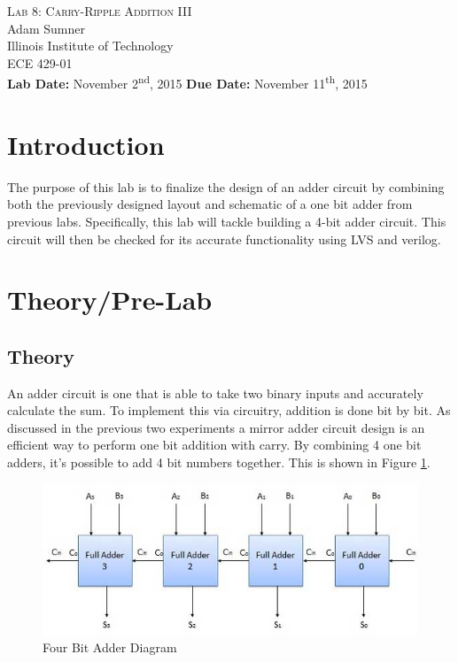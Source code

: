 \documentclass[12pt]{article}
\begin{document}
\begin{titlepage}
	\begin{center}
		
		
		\vfill
		
		\textsc{\LARGE Lab 8: Carry-Ripple Addition III}\\[1.5cm]
		
		\Large Adam Sumner\\[0.5cm]
		
		\Large Illinois Institute of Technology\\[0.5cm]
		
		\Large ECE 429-01\\[0.5cm]	
		
		\noindent
		\vfill
		\large \textbf{Lab Date:} November 2\textsuperscript{nd}, 2015\hfill
		\large \textbf{Due Date:} November 11\textsuperscript{th}, 2015
	
		
	\end{center}
\end{titlepage}

\section{Introduction}
The purpose of this lab is to finalize the design of an adder circuit by combining both the previously designed layout and schematic of a one bit adder from previous labs. Specifically, this lab will tackle building a 4-bit adder circuit. This circuit will then be checked for its accurate functionality using LVS and verilog. 
\section{Theory/Pre-Lab}
\subsection{Theory}
An adder circuit is one that is able to take two binary inputs and accurately calculate the sum. To implement this via circuitry, addition is done bit by bit. As discussed in the previous two experiments a mirror adder circuit design is an efficient way to perform one bit addition with carry. By combining 4 one bit adders, it's possible to add 4 bit numbers together. This is shown in Figure \ref{fig:diagram}.

\begin{figure}[H]
\centering
\includegraphics[width=0.7\linewidth]{diagram}
\caption{Four Bit Adder Diagram}
\label{fig:diagram}
\end{figure}
\end{document}

